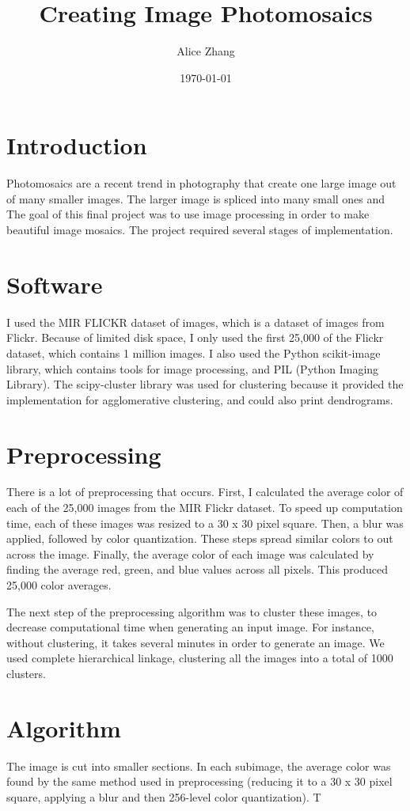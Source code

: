 \documentclass[12pt]{article}
\begin{document}
\cfoot{}
\lfoot{\today}
\rfoot{\thepage}

\title{Creating Image Photomosaics}
\date{\today}
\author{Alice Zhang}

\maketitle

\section{Introduction}
Photomosaics are a recent trend in photography that create one large image out of many smaller images. The larger image is spliced into many small ones and The goal of this final project was to use image processing in order to make beautiful image mosaics. The project required several stages of implementation.

\section{Software}
I used the MIR FLICKR dataset of images, which is a dataset of images from Flickr. Because of limited disk space, I only used the first 25,000 of the Flickr dataset, which contains 1 million images. I also used the Python scikit-image library, which contains tools for image processing, and PIL (Python Imaging Library). The scipy-cluster library was used for clustering because it provided the implementation for agglomerative clustering, and could also print dendrograms.

\section{Preprocessing}
There is a lot of preprocessing that occurs. First, I calculated the average color of each of the 25,000 images from the MIR Flickr dataset. To speed up computation time, each of these images was resized to a 30 x 30 pixel square. Then, a blur was applied, followed by color quantization. These steps spread similar colors to out across the image. Finally, the average color of each image was calculated by finding the average red, green, and blue values across all pixels. This produced 25,000 color averages. 

The next step of the preprocessing algorithm was to cluster these images, to decrease computational time when generating an input image. For instance, without clustering, it takes several minutes in order to generate an image. We used complete hierarchical linkage, clustering all the images into a total of 1000 clusters. 

\section{Algorithm}
The image is cut into smaller sections. In each subimage, the average color was found by the same method used in preprocessing (reducing it to a 30 x 30 pixel square, applying a blur and then 256-level color quantization). T 
\end{document}
